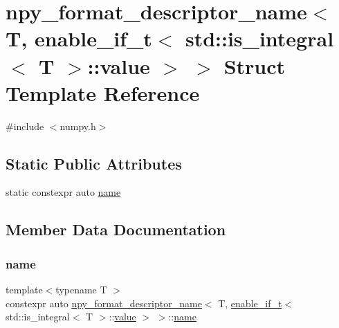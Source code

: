 \hypertarget{structnpy__format__descriptor__name_3_01_t_00_01enable__if__t_3_01std_1_1is__integral_3_01_t_01_4_1_1value_01_4_01_4}{}\section{npy\+\_\+format\+\_\+descriptor\+\_\+name$<$ T, enable\+\_\+if\+\_\+t$<$ std\+::is\+\_\+integral$<$ T $>$\+::value $>$ $>$ Struct Template Reference}
\label{structnpy__format__descriptor__name_3_01_t_00_01enable__if__t_3_01std_1_1is__integral_3_01_t_01_4_1_1value_01_4_01_4}


{\ttfamily \#include $<$numpy.\+h$>$}

\subsection*{Static Public Attributes}
\begin{DoxyCompactItemize}
\item 
static constexpr auto \mbox{\hyperlink{structnpy__format__descriptor__name_3_01_t_00_01enable__if__t_3_01std_1_1is__integral_3_01_t_01_4_1_1value_01_4_01_4_a8ed8aec337a5ea7bdb051ff9b376c8fc}{name}}
\end{DoxyCompactItemize}


\subsection{Member Data Documentation}
\mbox{\label{structnpy__format__descriptor__name_3_01_t_00_01enable__if__t_3_01std_1_1is__integral_3_01_t_01_4_1_1value_01_4_01_4_a8ed8aec337a5ea7bdb051ff9b376c8fc}} 
\subsubsection{\texorpdfstring{name}{name}}
{\footnotesize\ttfamily template$<$typename T $>$ \\
constexpr auto \mbox{\hyperlink{structnpy__format__descriptor__name}{npy\+\_\+format\+\_\+descriptor\+\_\+name}}$<$ T, \mbox{\hyperlink{detail_2common_8h_a012819c9e8b5e04872a271f50f8b8196}{enable\+\_\+if\+\_\+t}}$<$ std\+::is\+\_\+integral$<$ T $>$\+::\mbox{\hyperlink{_s_d_l__opengl__glext_8h_a8ad81492d410ff2ac11f754f4042150f}{value}} $>$ $>$\+::\mbox{\hyperlink{structname}{name}}\hspace{0.3cm}{\ttfamily [static]}}


